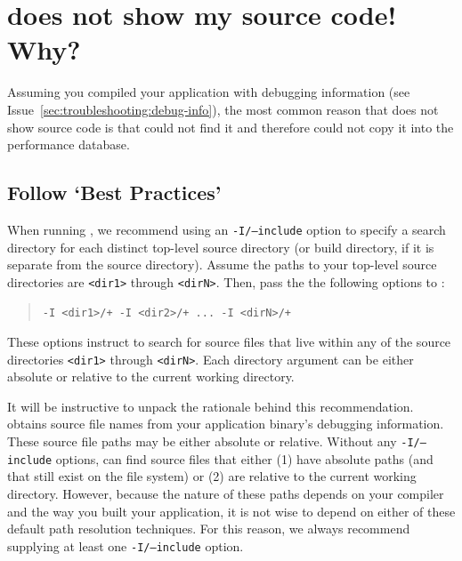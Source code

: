\documentclass[11pt,letterpaper]{report}
\begin{document}

\section{\hpcviewer{} does not show my source code! Why?}


Assuming you compiled your application with debugging information (see Issue~\ref{sec:troubleshooting:debug-info}), the most common reason that \hpcviewer{} does not show source code is that \hpcprofAll{} could not find it and therefore could not copy it into the \HPCToolkit{} performance database.




\subsection{Follow `Best Practices'}

When running \hpcprofAll{}, we recommend using an \texttt{-I/--include} option to specify a search directory for each distinct top-level source directory (or build directory, if it is separate from the source directory).
Assume the paths to your top-level source directories are \texttt{<dir1>} through \texttt{<dirN>}.
Then, pass the the following options to \hpcprofAll{}:
\begin{quote}
  \verb|-I <dir1>/+ -I <dir2>/+ ... -I <dirN>/+|
\end{quote}
These options instruct \hpcprofAll{} to search for source files that live within any of the source directories \texttt{<dir1>} through \texttt{<dirN>}.
Each directory argument can be either absolute or relative to the current working directory.

It will be instructive to unpack the rationale behind this recommendation.
\hpcprofAll{} obtains source file names from your application binary's debugging information.
These source file paths may be either absolute or relative.
Without any \texttt{-I/--include} options, \hpcprofAll{} can find source files that either (1) have absolute paths (and that still exist on the file system) or (2) are relative to the current working directory.
However, because the nature of these paths depends on your compiler and the way you built your application, it is not wise to depend on either of these default path resolution techniques.
For this reason, we always recommend supplying at least one \texttt{-I/--include} option.
\end{document}
